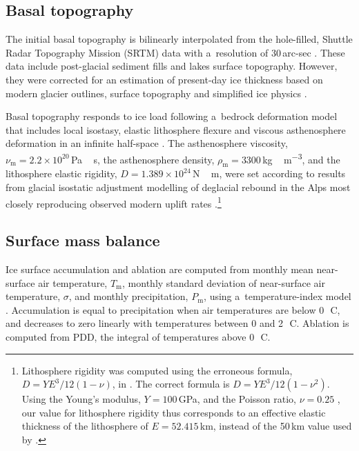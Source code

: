 \documentclass[tc, manuscript]{copernicus}
\begin{document}
\subsection{Basal topography}
\label{sec:bedrock}

    The initial basal topography is bilinearly interpolated from the
    hole-filled, Shuttle Radar Topography Mission (SRTM) data with a~resolution
    of 30\,arc-sec \citep{Jarvis.etal.2008}. These data include post-glacial
    sediment fills and lakes surface topography. However, they were corrected
    for an estimation of present-day ice thickness based on modern
    glacier outlines, surface topography and simplified ice physics
    \citep{Huss.Farinotti.2012}.

    Basal topography responds to ice load following a~bedrock deformation model
    that includes local isostasy, elastic lithosphere flexure and viscous
    asthenosphere deformation in an infinite half-space
    \citep{Lingle.Clark.1985,Bueler.etal.2007}. The asthenosphere viscosity,
    $\nu_{\mathrm{m}}=2.2\times10^{20}$\,\unit{Pa\,s}, the asthenosphere
    density, $\rho_{\mathrm{m}}=3300$\,\unit{kg\,m^{-3}}, and the lithosphere
    elastic rigidity, $D=1.389 \times 10^{24}$\,\unit{N\,m}, were set according to
    results from glacial isostatic adjustment modelling of deglacial rebound in
    the Alps most closely reproducing observed modern uplift rates
    \citep[Supplementary Fig.~7]{Mey.etal.2016}.\footnote{Lithosphere rigidity
    was computed using the erroneous formula, ${D=YE^3/12(1-\nu)}$, in
    \citep{Mey.etal.2016}. The correct formula is ${D=YE^3/12(1-\nu^2)}$.
    Using the Young's modulus, $Y=100$\,GPa, and the Poisson ratio, $\nu=0.25$
    \citep{Mey.etal.2016}, our value for lithosphere rigidity thus corresponds
    to an effective elastic thickness of the lithosphere of $E=52.415$\,km,
    instead of the 50\,km value used by \citet{Mey.etal.2016}.}


\subsection{Surface mass balance}
\label{sec:surface}

    Ice surface accumulation and ablation are computed from monthly mean
    near-surface air temperature, $T_{\mathrm{m}}$, monthly standard deviation
    of near-surface air temperature, $\sigma$, and monthly precipitation,
    $P_{\mathrm{m}}$, using a~temperature-index model
    \citep[e.g.,][]{Hock.2003}. Accumulation is equal to precipitation when air
    temperatures are below 0\,\unit{{\degree}C}, and decreases to zero linearly
    with temperatures between 0 and 2\,\unit{{\degree}C}. Ablation is computed
    from PDD, the integral of temperatures above 0\,\unit{{\degree}C}.
\end{document}
